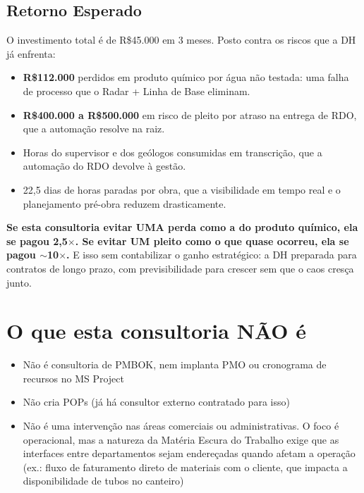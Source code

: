 \documentclass[12pt,a4paper]{scrartcl}
\begin{document}
\subsection{Retorno Esperado}

O investimento total é de R\$45.000 em 3 meses. Posto contra os riscos que a DH já enfrenta:

\begin{itemize}
  \item \textbf{R\$112.000} perdidos em produto químico por água não testada: uma falha de processo que o Radar + Linha de Base eliminam.
  \item \textbf{R\$400.000 a R\$500.000} em risco de pleito por atraso na entrega de RDO, que a automação resolve na raiz.
  \item Horas do supervisor e dos geólogos consumidas em transcrição, que a automação do RDO devolve à gestão.
  \item 22,5 dias de horas paradas por obra, que a visibilidade em tempo real e o planejamento pré-obra reduzem drasticamente.
\end{itemize}

\textbf{Se esta consultoria evitar UMA perda como a do produto químico, ela se pagou 2,5$\times$. Se evitar UM pleito como o que quase ocorreu, ela se pagou $\sim$10$\times$.} E isso sem contabilizar o ganho estratégico: a DH preparada para contratos de longo prazo, com previsibilidade para crescer sem que o caos cresça junto.

\section{O que esta consultoria NÃO é}

\begin{itemize}
  \item Não é consultoria de PMBOK, nem implanta PMO ou cronograma de recursos no MS Project
  \item Não cria POPs (já há consultor externo contratado para isso)
  \item Não é uma intervenção nas áreas comerciais ou administrativas. O foco é operacional, mas a natureza da Matéria Escura do Trabalho exige que as interfaces entre departamentos sejam endereçadas quando afetam a operação (ex.: fluxo de faturamento direto de materiais com o cliente, que impacta a disponibilidade de tubos no canteiro)
\end{itemize}
\end{document}
